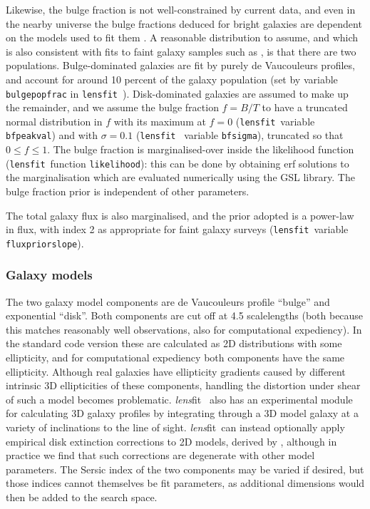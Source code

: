 \documentclass{article}
\def\lensfit{{\tt lensfit}\ }
\def\lensfitsuite{{\em lens}fit\ }
\begin{document}
Likewise, the bulge fraction is not well-constrained by current data, and even in the nearby universe
the bulge fractions deduced for bright galaxies are dependent on the models used to fit them
\citep{graham08a}.  A reasonable distribution to assume, and which is also consistent with
fits to faint galaxy samples such as \citet{schade96a}, is that there are two populations.  Bulge-dominated
galaxies are fit by purely de Vaucouleurs profiles, and account for around 10 percent of the galaxy population
(set by variable {\tt bulgepopfrac} in \lensfit ). Disk-dominated galaxies are assumed to make up the
remainder, and we assume the bulge fraction $f = B/T$ to have a truncated normal distribution 
in $f$ with its maximum at $f=0$ (\lensfit variable {\tt bfpeakval}) and with $\sigma = 0.1$ (\lensfit
variable {\tt bfsigma}), truncated so that $0 \le f \le 1$.  The bulge fraction is marginalised-over
inside the likelihood function (\lensfit function {\tt likelihood}): this can be done by obtaining
erf solutions to the marginalisation which are evaluated numerically using the GSL library.
The bulge fraction prior is independent of other parameters.

The total galaxy flux is also marginalised, and the prior adopted is a power-law in flux, with index 2
as appropriate for faint galaxy surveys (\lensfit variable {\tt fluxpriorslope}).

\subsubsection{Galaxy models}
The two galaxy model components are de Vaucouleurs profile ``bulge'' and exponential ``disk''.  Both
components are cut off at 4.5 scalelengths (both because this matches reasonably well observations,
also for computational expediency).  In the standard code version these are calculated as 2D distributions
with some ellipticity, and for computational expediency both components have the same ellipticity.
Although real galaxies have ellipticity gradients caused by different intrinsic 3D ellipticities of these
components, handling the distortion under shear of such a model becomes problematic.  \lensfitsuite
also has an experimental module for calculating 3D galaxy profiles by integrating through a 3D model
galaxy at a variety of inclinations to the line of sight.  \lensfitsuite can instead optionally apply
empirical disk extinction corrections to 2D models, derived by \citet{graham08a}, although in practice 
we find that such corrections are degenerate with other model parameters.  The Sersic index of the two
components may be varied if desired, but those indices cannot themselves be fit parameters, as additional
dimensions would then be added to the search space.
\end{document}
